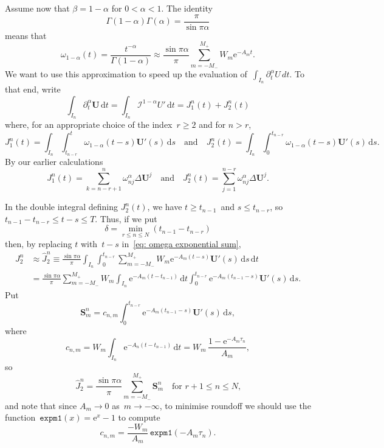 \documentclass[a4paper,12pt]{article}
\newcommand{\bs}[1]{\boldsymbol{#1}}
\newcommand{\ud}{\mathrm{d}}
\newcommand{\ue}{\mathrm{e}}
\begin{document}
Assume now that $\beta=1-\alpha$ for $0<\alpha<1$.  The identity
\[
\Gamma(1-\alpha)\Gamma(\alpha)=\frac{\pi}{\sin\pi\alpha}
\]
means that
\begin{equation}\label{eq: omega exponential sum}
\omega_{1-\alpha}(t)=\frac{t^{-\alpha}}{\Gamma(1-\alpha)}
    \approx\frac{\sin\pi\alpha}{\pi}\sum_{m=-M_-}^{M_+}W_m\ue^{-A_mt}.
\end{equation}
We want to use this approximation to speed up the evaluation
of~$\int_{I_n}\partial_t^\alpha U\,dt$.  To that end, write
\[
\int_{I_n}\partial_t^\alpha\bs{U}\,\ud t
    =\int_{I_n}\mathcal{I}^{1-\alpha}U'\,\ud t=J^n_1(t)+J^n_2(t)
\]
where, for an appropriate choice of the index~$r\ge2$ and for $n>r$,
\[
J^n_1(t)=\int_{I_n}\int_{t_{n-r}}^t\omega_{1-\alpha}(t-s)\bs{U}'(s)\,\ud s
\quad\text{and}\quad
J^n_2(t)=\int_{I_n}\int_0^{t_{n-r}}\omega_{1-\alpha}(t-s)\bs{U}'(s)\,\ud s.
\]
By our earlier calculations
\[
J_1^n(t)=\sum_{k=n-r+1}^n \omega^\alpha_{nj}\Delta\bs{U}^j
\quad\text{and}\quad
J_2^n(t)=\sum_{j=1}^{n-r}\omega^\alpha_{nj}\Delta\bs{U}^j.
\]

In the double integral defining $J^n_2(t)$, we have $t\ge t_{n-1}$~and
$s\le t_{n-r}$, so $t_{n-1}-t_{n-r}\le t-s\le T$.  Thus, if we put
\[
\delta=\min_{r\le n\le N}(t_{n-1}-t_{n-r})
\]
then, by replacing $t$ with~$t-s$ in~\eqref{eq: omega exponential sum},
\begin{align*}
J_2^n&\approx \hat J_2^n\equiv\frac{\sin\pi\alpha}{\pi}\int_{I_n}
    \int_0^{t_{n-r}}\sum_{m=-M_-}^{M_+}
        W_m\ue^{-A_m(t-s)}\bs{U}'(s)\,\ud s\,\ud t\\
    &=\frac{\sin\pi\alpha}{\pi}\sum_{m=-M_-}^{M_+}W_m
    \int_{I_n}\ue^{-A_m(t-t_{n-1})}\,\ud t
    \int_0^{t_{n-r}}\ue^{-A_m(t_{n-1}-s)}\bs{U}'(s)\,\ud s.
\end{align*}
Put
\[
\bs{S}^n_m= c_{n,m}\int_0^{t_{n-r}}\ue^{-A_m(t_{n-1}-s)}\bs{U}'(s)\,\ud s,
\]
where
\[
c_{n,m}=W_m\int_{I_n}\ue^{-A_n(t-t_{n-1})}\,\ud t
    =W_m\,\frac{1-\ue^{-A_m\tau_n}}{A_m},
\]
so
\[
\hat J^n_2=\frac{\sin\pi\alpha}{\pi}\sum_{m=-M_-}^{M_+}\bs{S}^n_m
    \quad\text{for $r+1\le n\le N$,}
\]
and note that since $A_m\to0$ as~$m\to-\infty$, to minimise roundoff we should
use the function~$\mathtt{expm1}(x)=\ue^x-1$ to compute
\[
c_{n,m}=\frac{-W_m}{A_m}\,\mathtt{expm1}(-A_m\tau_n).
\]
\end{document}

